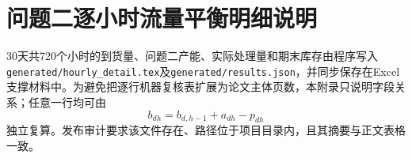 \section{问题二逐小时流量平衡明细说明}

30天共720个小时的到货量、问题二产能、实际处理量和期末库存由程序写入\texttt{generated/hourly\_detail.tex}及\texttt{generated/results.json}，并同步保存在Excel支撑材料中。为避免把逐行机器复核表扩展为论文主体页数，本附录只说明字段关系；任意一行均可由
\begin{equation}
 b_{dh}=b_{d,h-1}+a_{dh}-p_{dh}
\end{equation}
独立复算。发布审计要求该文件存在、路径位于项目目录内，且其摘要与正文表格一致。
